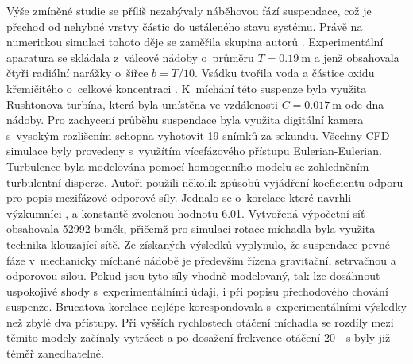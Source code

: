 Výše zmíněné studie se příliš nezabývaly náběhovou fází suspendace, což je přechod od nehybné vrstvy částic do ustáleného stavu systému. Právě na numerickou simulaci tohoto děje se zaměřila skupina autorů \citet{tamb09}. Experimentální aparatura se skládala z~válcové nádoby o~průměru $T=\SI{0.19}{\meter}$ a jenž obsahovala čtyři radiální narážky o~šířce $b=T/10$. Vsádku tvořila voda a částice oxidu křemičitého o~celkové koncentraci . K~míchání této suspenze byla využita Rushtonova turbína, která byla umístěna ve vzdálenosti $C=\SI{0.017}{\meter}$ ode dna nádoby. Pro zachycení průběhu suspendace byla využita digitální kamera s~vysokým rozlišením schopna vyhotovit \num{19} snímků za sekundu. Všechny CFD simulace byly provedeny s~využítím vícefázového přístupu Eulerian-Eulerian. Turbulence byla modelována pomocí homogenního \keps{} modelu se zohledněním turbulentní disperze. Autoři použili několik způsobů vyjádření koeficientu odporu pro popis mezifázové odporové síly. Jednalo se o~korelace které navrhli výzkumníci \citet{cli78}, \citet{bru98} a konstantě zvolenou hodnotu \num{6.01}. Vytvořená výpočetní síť obsahovala \num{52992} buněk, přičemž pro simulaci rotace míchadla byla využita technika klouzající sítě. Ze získaných výsledků vyplynulo, že suspendace pevné fáze v~mechanicky míchané nádobě je především řízena gravitační, setrvačnou a odporovou silou. Pokud jsou tyto síly vhodně modelovaný, tak lze dosáhnout uspokojivé shody s~experimentálními údaji, i při popisu přechodového chování suspenze. Brucatova korelace nejlépe korespondovala s~experimentálními výsledky než zbylé dva přístupy. Při vyšších rychlostech otáčení míchadla se rozdíly mezi těmito modely začínaly vytrácet a po dosažení frekvence otáčení \SI{20}{\per\second} byly již téměř zanedbatelné.

